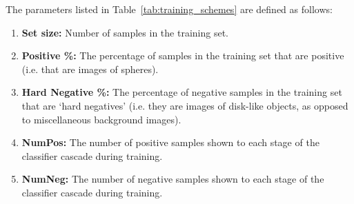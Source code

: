 \documentclass{sig-alternate-05-2015}
\newcommand{\scarequotes}[1]{`#1'}
\newcommand{\newterm}[1]{{\textit{#1}}}
\newcommand{\citep}[1]{\cite{#1}}
\begin{document}
{		%
		The parameters listed in Table~\ref{tab:training_schemes} are defined as follows:

		\begin{enumerate}
			\item{\textbf{Set size:}} Number of samples in the training set.
			\item{\textbf{Positive \%:}} The percentage of samples in the training set that are positive (i.e. that are images of spheres).
			\item{\textbf{Hard Negative \%:}} The percentage of negative samples in the training set that are \scarequotes{hard negatives} (i.e. they are images of disk-like objects, as opposed to miscellaneous background images).
			\item{\textbf{NumPos:}} The number of positive samples shown to each stage of the classifier cascade during training.
			\item{\textbf{NumNeg:}} The number of negative samples shown to each stage of the classifier cascade during training.
		\end{enumerate}



}
\end{document}
